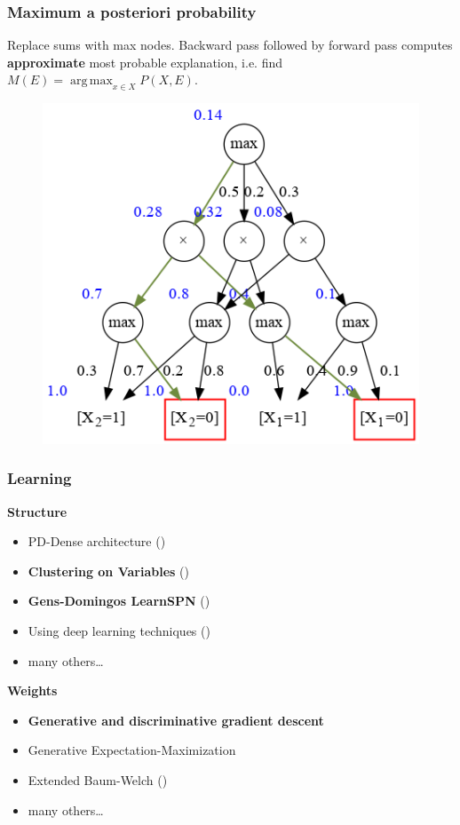 \documentclass{beamer}
\DeclareMathOperator*{\argmax}{arg\,max}
\begin{document}
\begin{frame}
  \frametitle{Maximum a posteriori probability}

  Replace sums with max nodes. Backward pass followed by forward pass computes \textbf{approximate}
  most probable explanation, i.e. find $M(E)=\argmax_{x\in X} P(X, E)$.

  \begin{figure}
    \centering\includegraphics[height=0.6\textheight]{imgs/sample_mpn_prob.png}
  \end{figure}
\end{frame}

\begin{frame}
  \frametitle{Learning}

  \textbf{Structure}
  \begin{itemize}
    \item PD-Dense architecture (\cite{poon-domingos})
    \item \textbf{Clustering on Variables} (\cite{clustering})
    \item \textbf{Gens-Domingos LearnSPN} (\cite{gens-domingos})
    \item Using deep learning techniques (\cite{deep-learn-spn})
    \item many others\ldots
  \end{itemize}

  \textbf{Weights}
  \begin{itemize}
    \item \textbf{Generative and discriminative gradient descent}
    \item Generative Expectation-Maximization
    \item Extended Baum-Welch (\cite{baum-welch})
    \item many others\ldots
  \end{itemize}
\end{frame}
\end{document}
